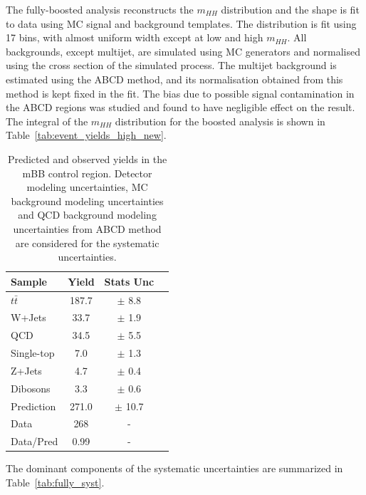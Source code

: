 The fully-boosted analysis reconstructs the ${m_{HH}}$ distribution and the shape is fit to data using MC signal and background templates. The distribution is fit using 17
bins, with almost uniform width except at low and high $m_{HH}$. %
All backgrounds, except multijet, are
simulated using MC generators and normalised using the cross section of the
simulated process. The multijet background is estimated using the ABCD
method, and its normalisation obtained from this method is kept fixed in the fit. The bias due
to possible signal contamination in the ABCD regions was studied
and found to have negligible effect on the result.  The integral of the $m_{HH}$
distribution for the boosted analysis is shown in
Table~\ref{tab:event_yields_high_new}.
\renewcommand{\arraystretch}{1.5}
\begin{table}
\begin{center}
\begin{tabular}{l|c|c|c}
\hline
Sample        &  Yield   &  Stats Unc \\ 
\hline 
$t\bar{t}$    &  187.7  & $\pm$ 8.8    \\
W+Jets        &  33.7   & $\pm$ 1.9     \\
QCD           &  34.5   & $\pm$ 5.5     \\
Single-top    &  7.0   & $\pm$ 1.3     \\
Z+Jets        &  4.7    & $\pm$ 0.4        \\
Dibosons      &  3.3    & $\pm$ 0.6      \\
\hline
Prediction    &  271.0  & $\pm$ 10.7       \\
Data          &  268    & - \\
\hline
Data/Pred     &  0.99    & -  \\
\hline
\end{tabular}
\end{center}
\caption[Predicted and observed yields in the mBB control region]{Predicted and observed yields in the mBB control region. Detector modeling
uncertainties, MC background modeling uncertainties and QCD background modeling uncertainties
from ABCD method are considered for the systematic uncertainties.}
\label{tab:boosted_bkgd_mbbcr_yields_new}
\end{table}
\renewcommand{\arraystretch}{1.0}
 
The dominant components of the systematic uncertainties are summarized in Table~\ref{tab:fully_syst}.
\newpage

